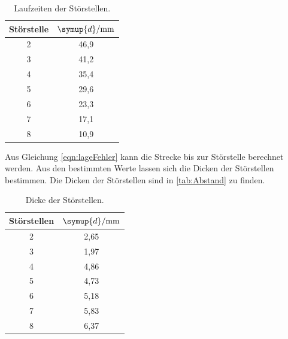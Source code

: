 \begin{table}[H]
  \centering
  \begin{tabular}{c c}
    \toprule
    Störstelle & $\symup{d}/\unit{\milli\meter}$ \\
    \midrule
     2 & 46,9 \\
     3 & 41,2 \\
     4 & 35,4 \\
     5 & 29,6 \\
     6 & 23,3 \\
     7 & 17,1 \\
     8 & 10,9 \\
    \bottomrule
  \end{tabular}
  \caption{Laufzeiten der Störstellen.}
  \label{tab:Laufzeiten2}
\end{table}
Aus Gleichung \eqref{eqn:lageFehler} kann die Strecke bis zur Störstelle berechnet werden. Aus den bestimmten Werte lassen sich
die Dicken der Störstellen bestimmen. Die Dicken der Störstellen sind in \autoref{tab:Abstand} zu finden.
\begin{table}
  \centering
  \begin{tabular}{c c}
    \toprule
    Störstellen & $\symup{d}/\unit{\milli\meter}$ \\
    \midrule
     2 & 2,65 \\
     3 & 1,97 \\
     4 & 4,86 \\
     5 & 4,73 \\
     6 & 5,18 \\
     7 & 5,83 \\
     8 & 6,37 \\
    \bottomrule
  \end{tabular}
  \caption{Dicke der Störstellen.}
  \label{tab:Abstand}
\end{table}








